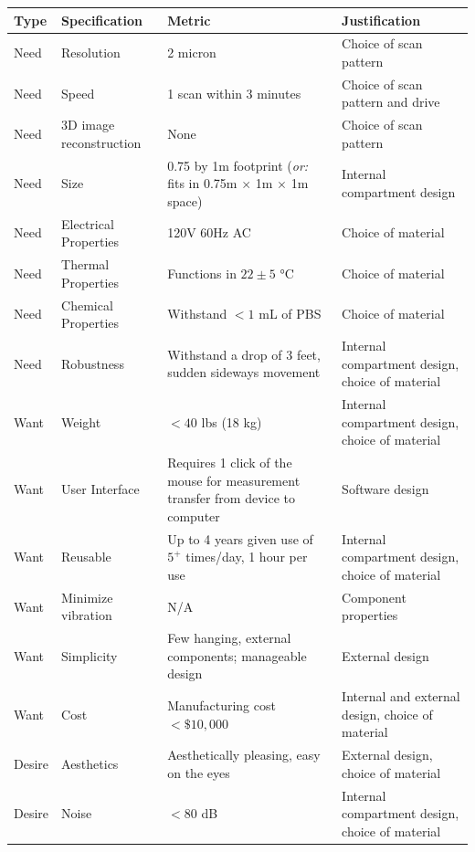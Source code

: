 \documentclass{article}
\begin{document}
\begin{table}[H]
  \footnotesize
  \centering
  \begin{tabularx}{\textwidth}{llXX}
    \toprule
    \textbf{Type} & \textbf{Specification} & \textbf{Metric} & \textbf{Justification} \\
    \hline
    Need & Resolution & 2 micron & Choice of scan pattern \\
    Need & Speed & 1 scan within 3 minutes & Choice of scan pattern and drive \\
    Need & 3D image reconstruction & None & Choice of scan pattern \\
    Need & Size & 0.75 by 1m footprint (\textit{or:} fits in 0.75m $\times$ 1m $\times$ 1m space) & Internal compartment design \\
    Need & Electrical Properties & 120V 60Hz AC & Choice of material \\
    Need & Thermal Properties & Functions in $22\pm5$ °C & Choice of material \\
    Need & Chemical Properties & Withstand $<1$ mL of PBS & Choice of material \\
    Need & Robustness & Withstand a drop of 3 feet, sudden sideways movement & Internal compartment design, choice of material \\
    Want & Weight & $<40$ lbs (18 kg) & Internal compartment design, choice of material \\
    Want & User Interface & Requires 1 click of the mouse for measurement transfer from device to computer & Software design \\
    Want & Reusable & Up to 4 years given use of $5^+$ times/day, 1 hour per use & Internal compartment design, choice of material \\
    Want & Minimize vibration & N/A & Component properties \\
    Want & Simplicity & Few hanging, external components; manageable design & External design \\
    Want & Cost & Manufacturing cost $<\$10,000$ & Internal and external design, choice of material \\
    Desire & Aesthetics & Aesthetically pleasing, easy on the eyes & External design, choice of material \\
    Desire & Noise & $<80$ dB & Internal compartment design, choice of material \\
    \bottomrule
  \end{tabularx}
  \label{tab:eds}
\end{table}
\end{document}
